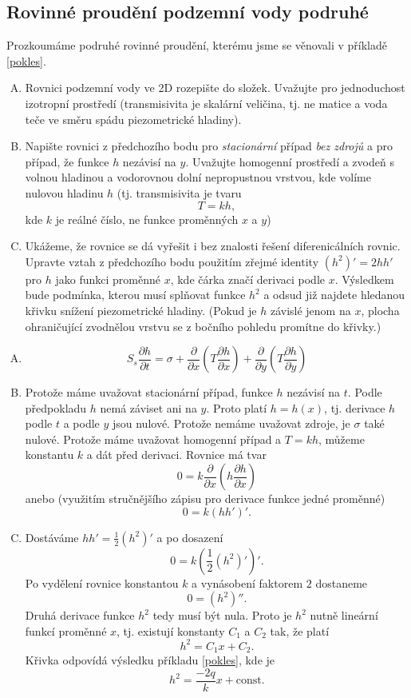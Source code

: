 \subsection{Rovinné proudění podzemní vody podruhé}

Prozkoumáme podruhé rovinné proudění, kterému jsme se věnovali v
příkladě \ref{pokles}.

\begin{enumerate}[A)]
\item Rovnici podzemní vody ve 2D rozepište do složek. Uvažujte pro jednoduchost izotropní prostředí (transmisivita je skalární veličina, tj. ne matice a voda teče ve směru spádu piezometrické hladiny).
\item Napište rovnici z předchozího bodu pro \textit{stacionární} případ \textit{bez zdrojů} a pro případ, že funkce $h$ nezávisí na $y$. Uvažujte homogenní prostředí a zvodeň s volnou hladinou a vodorovnou dolní nepropustnou vrstvou, kde volíme nulovou hladinu $h$ (tj. transmisivita je tvaru $$T=kh,$$ kde $k$ je reálné číslo, ne funkce proměnných $x$ a $y$)
\item Ukážeme, že rovnice se dá vyřešit i bez znalosti řešení diferenicálních rovnic. Upravte vztah z předchozího bodu použitím zřejmé identity
  $(h^2)'=2 h h'$
  pro $h$ jako funkci proměnné  $x$, kde čárka značí derivaci podle $x$. Výsledkem bude podmínka, kterou musí splňovat funkce $h^2$ a odsud již najdete hledanou křivku snížení piezometrické hladiny. (Pokud je $h$ závislé jenom na $x$, plocha ohraničující zvodnělou vrstvu se z bočního pohledu promítne do křivky.)
\end{enumerate}


\reseni
\begin{enumerate}[A)]
\item $$S_s\frac{\partial h}{\partial t}=\sigma + \frac{\partial }{\partial x}\left (T \frac{\partial h}{\partial x} \right)
  +
  \frac{\partial }{\partial y}\left (T \frac{\partial h}{\partial y} \right)
  $$
\item Protože máme uvažovat stacionární případ, funkce $h$ nezávisí na $t$. Podle předpokladu $h$ nemá záviset ani na $y$. Proto platí $h=h(x)$, tj. derivace $h$ podle $t$ a podle $y$ jsou nulové.
  Protože nemáme uvažovat zdroje, je $\sigma$ také nulové. Protože máme uvažovat homogenní případ a $T=kh$, můžeme konstantu $k$ a dát před derivaci.  Rovnice má tvar
  $$0=k\frac{\partial }{\partial x}\left ( h\frac{\partial h}{\partial x} \right)
  $$
  anebo (využitím stručnějšího zápisu pro derivace funkce jedné proměnné)
  $$0=k(h h')'.$$
\item Dostáváme $h h' = \frac12 (h^2)'$ a po dosazení
$$0=k\left(\frac 12 (h^2)'\right )'.$$ Po vydělení rovnice konstantou $k$ a vynásobení faktorem $2$ dostaneme 
  $$0=(h^2)''.$$
  Druhá derivace funkce $h^2$ tedy musí být nula. Proto je $h^2$ nutně lineární funkcí proměnné $x$, tj. existují konstanty $C_1$ a $C_2$ tak, že platí $$h^2=C_1x+C_2.$$
  Křivka odpovídá výsledku příkladu  \ref{pokles}, kde je
  $$h^2=\frac{-2q}k x + \text{const.}$$
\end{enumerate}
\konec

